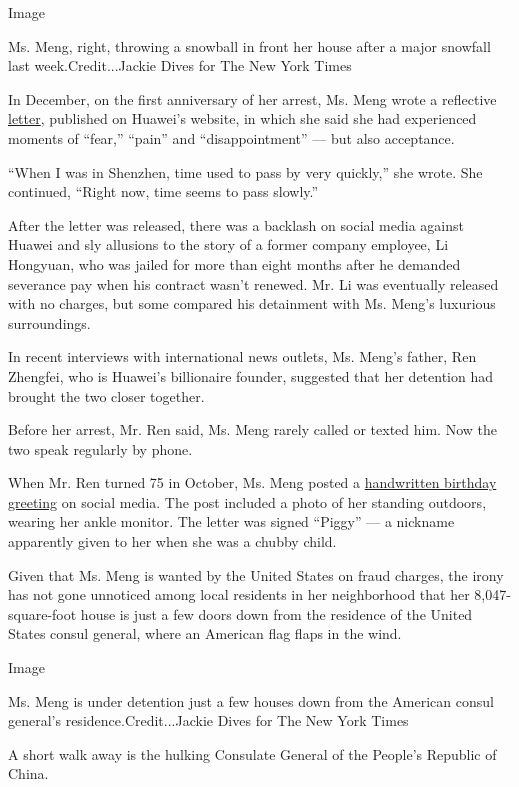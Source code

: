 Image

Ms. Meng, right, throwing a snowball in front her house after a major
snowfall last week.Credit...Jackie Dives for The New York Times

In December, on the first anniversary of her arrest, Ms. Meng wrote a
reflective
\href{https://www.huawei.com/en/facts/voices-of-huawei/your-warmth-is-a-beacon-that-lights-my-way-forward}{letter},
published on Huawei's website, in which she said she had experienced
moments of ``fear,'' ``pain'' and ``disappointment'' --- but also
acceptance.

``When I was in Shenzhen, time used to pass by very quickly,'' she
wrote. She continued, ``Right now, time seems to pass slowly.''

After the letter was released, there was a backlash on social media
against Huawei and sly allusions to the story of a former company
employee, Li Hongyuan, who was jailed for more than eight months after
he demanded severance pay when his contract wasn't renewed. Mr. Li was
eventually released with no charges, but some compared his detainment
with Ms. Meng's luxurious surroundings.

In recent interviews with international news outlets, Ms. Meng's father,
Ren Zhengfei, who is Huawei's billionaire founder, suggested that her
detention had brought the two closer together.

Before her arrest, Mr. Ren said, Ms. Meng rarely called or texted him.
Now the two speak regularly by phone.

When Mr. Ren turned 75 in October, Ms. Meng posted a
\href{http://xinsheng.huawei.com/cn/index.php?app=forum\&mod=Detail\&act=index\&id=4471927\&p=1}{handwritten
birthday greeting} on social media. The post included a photo of her
standing outdoors, wearing her ankle monitor. The letter was signed
``Piggy'' --- a nickname apparently given to her when she was a chubby
child.

Given that Ms. Meng is wanted by the United States on fraud charges, the
irony has not gone unnoticed among local residents in her neighborhood
that her 8,047-square-foot house is just a few doors down from the
residence of the United States consul general, where an American flag
flaps in the wind.

Image

Ms. Meng is under detention just a few houses down from the American
consul general's residence.Credit...Jackie Dives for The New York Times

A short walk away is the hulking Consulate General of the People's
Republic of China.

